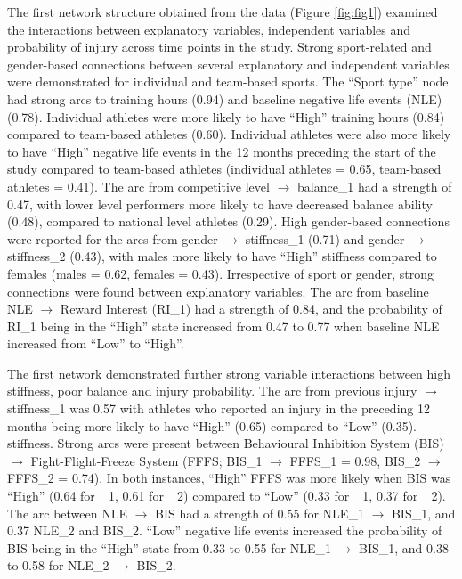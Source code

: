 \documentclass[
  english,
  man]{apa6}
\begin{document}
The first network structure obtained from the data (Figure \ref{fig:fig1}) examined the interactions between explanatory variables, independent variables and probability of injury across time points in the study.
Strong sport-related and gender-based connections between several explanatory and independent variables were demonstrated for individual and team-based sports.
The ``Sport type'' node had strong arcs to training hours (0.94) and baseline negative life events (NLE) (0.78).
Individual athletes were more likely to have ``High'' training hours (0.84) compared to team-based athletes (0.60).
Individual athletes were also more likely to have ``High'' negative life events in the 12 months preceding the start of the study compared to team-based athletes (individual athletes = 0.65, team-based athletes = 0.41).
The arc from competitive level \(\rightarrow\) balance\_1 had a strength of 0.47, with lower level performers more likely to have decreased balance ability (0.48), compared to national level athletes (0.29).
High gender-based connections were reported for the arcs from gender \(\rightarrow\) stiffness\_1 (0.71) and gender \(\rightarrow\) stiffness\_2 (0.43), with males more likely to have ``High'' stiffness compared to females (males = 0.62, females = 0.43).
Irrespective of sport or gender, strong connections were found between explanatory variables.
The arc from baseline NLE \(\rightarrow\) Reward Interest (RI\_1) had a strength of 0.84, and the probability of RI\_1 being in the ``High'' state increased from 0.47 to 0.77 when baseline NLE increased from ``Low'' to ``High''.

The first network demonstrated further strong variable interactions between high stiffness, poor balance and injury probability.
The arc from previous injury \(\rightarrow\) stiffness\_1 was 0.57 with athletes who reported an injury in the preceding 12 months being more likely to have ``High'' (0.65) compared to ``Low'' (0.35).
stiffness.
Strong arcs were present between Behavioural Inhibition System (BIS) \(\rightarrow\) Fight-Flight-Freeze System (FFFS; BIS\_1 \(\rightarrow\) FFFS\_1 = 0.98, BIS\_2 \(\rightarrow\) FFFS\_2 = 0.74).
In both instances, ``High'' FFFS was more likely when BIS was ``High'' (0.64 for \_1, 0.61 for \_2) compared to ``Low'' (0.33 for \_1, 0.37 for \_2).
The arc between NLE \(\rightarrow\) BIS had a strength of 0.55 for NLE\_1 \(\rightarrow\) BIS\_1, and 0.37 NLE\_2 and BIS\_2.
``Low'' negative life events increased the probability of BIS being in the ``High'' state from 0.33 to 0.55 for NLE\_1 \(\rightarrow\) BIS\_1, and 0.38 to 0.58 for NLE\_2 \(\rightarrow\) BIS\_2.
\end{document}
